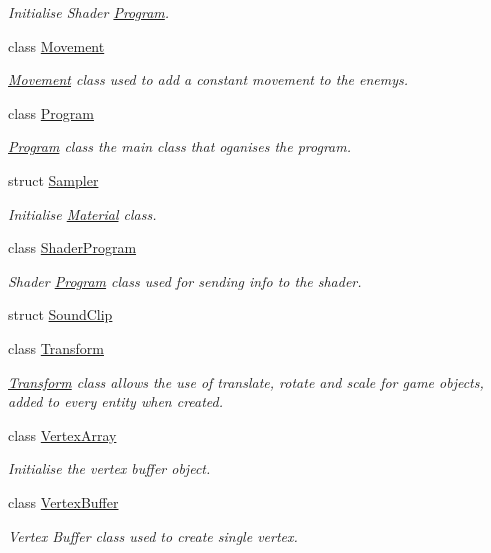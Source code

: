 \begin{DoxyCompactItemize}
\begin{DoxyCompactList}\small\item\em Initialise Shader \mbox{\hyperlink{class_aspect_1_1_engine_1_1_program}{Program}}. \end{DoxyCompactList}\item 
class \mbox{\hyperlink{class_aspect_1_1_engine_1_1_movement}{Movement}}
\begin{DoxyCompactList}\small\item\em \mbox{\hyperlink{class_aspect_1_1_engine_1_1_movement}{Movement}} class used to add a constant movement to the enemys. \end{DoxyCompactList}\item 
class \mbox{\hyperlink{class_aspect_1_1_engine_1_1_program}{Program}}
\begin{DoxyCompactList}\small\item\em \mbox{\hyperlink{class_aspect_1_1_engine_1_1_program}{Program}} class the main class that oganises the program. \end{DoxyCompactList}\item 
struct \mbox{\hyperlink{struct_aspect_1_1_engine_1_1_sampler}{Sampler}}
\begin{DoxyCompactList}\small\item\em Initialise \mbox{\hyperlink{class_aspect_1_1_engine_1_1_material}{Material}} class. \end{DoxyCompactList}\item 
class \mbox{\hyperlink{class_aspect_1_1_engine_1_1_shader_program}{Shader\+Program}}
\begin{DoxyCompactList}\small\item\em Shader \mbox{\hyperlink{class_aspect_1_1_engine_1_1_program}{Program}} class used for sending info to the shader. \end{DoxyCompactList}\item 
struct \mbox{\hyperlink{struct_aspect_1_1_engine_1_1_sound_clip}{Sound\+Clip}}
\item 
class \mbox{\hyperlink{class_aspect_1_1_engine_1_1_transform}{Transform}}
\begin{DoxyCompactList}\small\item\em \mbox{\hyperlink{class_aspect_1_1_engine_1_1_transform}{Transform}} class allows the use of translate, rotate and scale for game objects, added to every entity when created. \end{DoxyCompactList}\item 
class \mbox{\hyperlink{class_aspect_1_1_engine_1_1_vertex_array}{Vertex\+Array}}
\begin{DoxyCompactList}\small\item\em Initialise the vertex buffer object. \end{DoxyCompactList}\item 
class \mbox{\hyperlink{class_aspect_1_1_engine_1_1_vertex_buffer}{Vertex\+Buffer}}
\begin{DoxyCompactList}\small\item\em Vertex Buffer class used to create single vertex. \end{DoxyCompactList}\end{DoxyCompactItemize}
